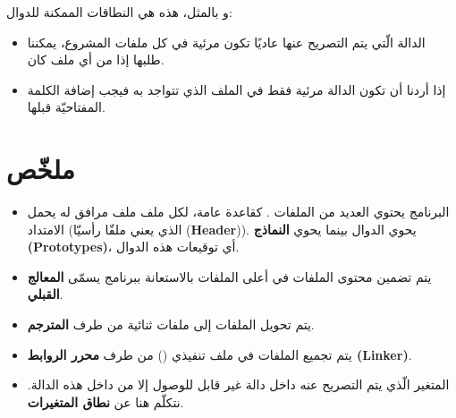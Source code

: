 و بالمثل، هذه هي النطاقات الممكنة للدوال:

\begin{itemize}
  \item الدالة الّتي يتم التصريح عنها عاديًا تكون مرئية في كل ملفات المشروع، يمكننا طلبها إذا من أي ملف كان.
  \item إذا أردنا أن تكون الدالة مرئية فقط في الملف الذي تتواجد به فيجب إضافة الكلمة المفتاحيّة
قبلها.
\end{itemize}

\section*{ملخّص}

\begin{itemize}
  \item البرنامج يحتوي العديد من الملفات
.
كقاعدة عامة، لكل ملف
ملف مرافق له يحمل الامتداد
(الذي يعني ملفّا رأسيّا
(\textbf{\textenglish{Header}})).
يحوي الدوال بينما
يحوي
\textbf{النماذج (\textenglish{Prototypes})}،
أي توقيعات هذه الدوال.
  \item يتم تضمين محتوى الملفات
في أعلى الملفات
بالاستعانة ببرنامج يسمّى
\textbf{المعالج القبلي}.
  \item يتم تحويل الملفات
إلى ملفات ثنائية
من طرف
\textbf{المترجم}.
  \item يتم تجميع الملفات
في ملف تنفيذي
()
من طرف
\textbf{محرر الروابط
(\textenglish{Linker})}.
  \item المتغير الّذي يتم التصريح عنه داخل دالة غير قابل للوصول إلا من داخل هذه الدالة. نتكلّم هنا عن
\textbf{نطاق المتغيرات}.
\end{itemize}
